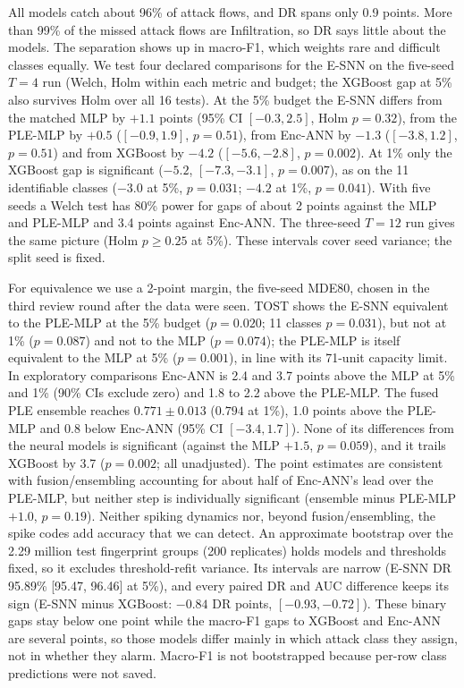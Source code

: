 \documentclass[conference]{IEEEtran}
\begin{document}
All models catch about 96\% of attack flows, and DR spans only 0.9 points. More than 99\% of the missed attack flows are Infiltration, so DR says little about the models. The separation shows up in macro-F1, which weights rare and difficult classes equally. We test four declared comparisons for the E-SNN on the five-seed $T = 4$ run (Welch, Holm within each metric and budget; the XGBoost gap at 5\% also survives Holm over all 16 tests). At the 5\% budget the E-SNN differs from the matched MLP by $+1.1$ points (95\% CI $[-0.3, 2.5]$, Holm $p = 0.32$), from the PLE-MLP by $+0.5$ ($[-0.9, 1.9]$, $p = 0.51$), from Enc-ANN by $-1.3$ ($[-3.8, 1.2]$, $p = 0.51$) and from XGBoost by $-4.2$ ($[-5.6, -2.8]$, $p = 0.002$). At 1\% only the XGBoost gap is significant ($-5.2$, $[-7.3, -3.1]$, $p = 0.007$), as on the 11 identifiable classes ($-3.0$ at 5\%, $p = 0.031$; $-4.2$ at 1\%, $p = 0.041$). With five seeds a Welch test has 80\% power for gaps of about 2 points against the MLP and PLE-MLP and 3.4 points against Enc-ANN. The three-seed $T = 12$ run gives the same picture (Holm $p \geq 0.25$ at 5\%). These intervals cover seed variance; the split seed is fixed.

For equivalence we use a 2-point margin, the five-seed MDE80, chosen in the third review round after the data were seen. TOST shows the E-SNN equivalent to the PLE-MLP at the 5\% budget ($p = 0.020$; 11 classes $p = 0.031$), but not at 1\% ($p = 0.087$) and not to the MLP ($p = 0.074$); the PLE-MLP is itself equivalent to the MLP at 5\% ($p = 0.001$), in line with its 71-unit capacity limit. In exploratory comparisons Enc-ANN is 2.4 and 3.7 points above the MLP at 5\% and 1\% (90\% CIs exclude zero) and 1.8 to 2.2 above the PLE-MLP. The fused PLE ensemble reaches $0.771 \pm 0.013$ ($0.794$ at 1\%), 1.0 points above the PLE-MLP and 0.8 below Enc-ANN (95\% CI $[-3.4, 1.7]$). None of its differences from the neural models is significant (against the MLP $+1.5$, $p = 0.059$), and it trails XGBoost by 3.7 ($p = 0.002$; all unadjusted). The point estimates are consistent with fusion/ensembling accounting for about half of Enc-ANN's lead over the PLE-MLP, but neither step is individually significant (ensemble minus PLE-MLP $+1.0$, $p = 0.19$). Neither spiking dynamics nor, beyond fusion/ensembling, the spike codes add accuracy that we can detect. An approximate bootstrap over the 2.29 million test fingerprint groups (200 replicates) holds models and thresholds fixed, so it excludes threshold-refit variance. Its intervals are narrow (E-SNN DR 95.89\% [95.47, 96.46] at 5\%), and every paired DR and AUC difference keeps its sign (E-SNN minus XGBoost: $-0.84$ DR points, $[-0.93, -0.72]$). These binary gaps stay below one point while the macro-F1 gaps to XGBoost and Enc-ANN are several points, so those models differ mainly in which attack class they assign, not in whether they alarm. Macro-F1 is not bootstrapped because per-row class predictions were not saved.
\end{document}
